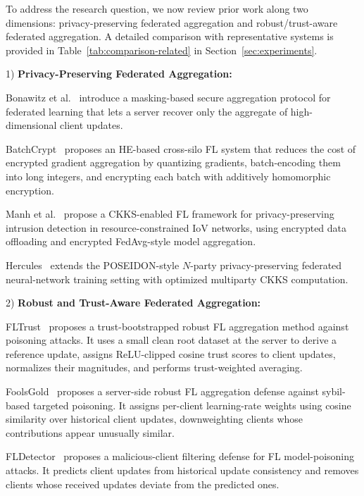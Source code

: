 \documentclass[journal]{IEEEtran}
\begin{document}
To address the research question, we now review prior work along two dimensions:
privacy-preserving federated aggregation and robust/trust-aware federated aggregation.
A detailed comparison with representative systems is provided in
Table~\ref{tab:comparison-related} in Section~\ref{sec:experiments}.

1) \noindent\textbf{Privacy-Preserving Federated Aggregation:}

Bonawitz et al.~\cite{bonawitz2017secagg} introduce a masking-based secure
aggregation protocol for federated learning that lets a server recover only the
aggregate of high-dimensional client updates. 

BatchCrypt~\cite{zhang2020batchcrypt} proposes an HE-based cross-silo FL
system that reduces the cost of encrypted gradient aggregation by quantizing
gradients, batch-encoding them into long integers, and encrypting each batch
with additively homomorphic encryption. 

Manh et al.~\cite{manh2024homomorphic} propose a CKKS-enabled FL framework for
privacy-preserving intrusion detection in resource-constrained IoV networks,
using encrypted data offloading and encrypted FedAvg-style model aggregation.

Hercules~\cite{xuhercules2023} extends the POSEIDON-style $N$-party
privacy-preserving federated neural-network training setting with optimized
multiparty CKKS computation. 

2) \noindent\textbf{Robust and Trust-Aware Federated Aggregation:}

FLTrust~\cite{cao2021fltrust} proposes a trust-bootstrapped robust FL
aggregation method against poisoning attacks. It uses a small clean root dataset
at the server to derive a reference update, assigns ReLU-clipped cosine trust
scores to client updates, normalizes their magnitudes, and performs
trust-weighted averaging. 

FoolsGold~\cite{fung_limitations_2020} proposes a server-side robust FL
aggregation defense against sybil-based targeted poisoning. It assigns
per-client learning-rate weights using cosine similarity over historical client
updates, downweighting clients whose contributions appear unusually similar.

FLDetector~\cite{zhang_fldetector_2022} proposes a malicious-client filtering
defense for FL model-poisoning attacks. It predicts client updates from
historical update consistency and removes clients whose received updates deviate
from the predicted ones. 
\end{document}

